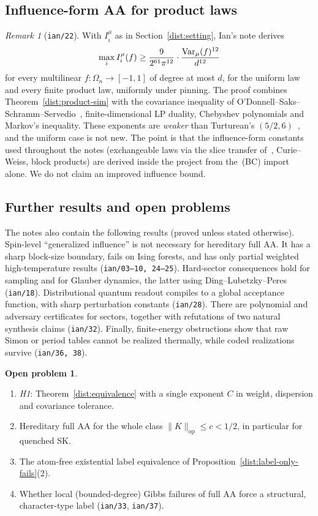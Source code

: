 \documentclass[11pt]{article}
\theoremstyle{definition}\newtheorem{definition}[theorem]{Definition}
\newtheorem{problem}[theorem]{Open problem}
\theoremstyle{remark}\newtheorem{remark}[theorem]{Remark}
\begin{document}
\subsection{Influence-form AA for product laws}\label{dist:influence}
\begin{remark}[\texttt{ian/22}]
With \(I_i^\mu\) as in Section~\ref{dist:setting}, Ian's note derives
\[
 \max_iI_i^{\mu}(f)\ge\frac{9}{2^{61}\pi^{12}}\cdot\frac{\operatorname{Var}_\mu(f)^{12}}{d^{12}}
\]
for every multilinear \(f:\Omega_n\to[-1,1]\) of degree at most \(d\), for the
uniform law and every finite product law, uniformly under pinning. The proof
combines Theorem~\ref{dist:product-sim} with the covariance inequality of
O'Donnell--Saks--Schramm--Servedio~\cite{OSSS05}, finite-dimensional LP duality,
Chebyshev polynomials and Markov's inequality. These exponents are
\emph{weaker} than Turturean's \((5/2,6)\)~\cite{Tur26}, and the uniform case is
not new. The point is that the influence-form constants used throughout the
notes (exchangeable laws via the slice transfer of~\cite{GMNR26}, Curie--Weiss,
block products) are derived inside the project from the~(BC) import alone. We
do not claim an improved influence bound.
\end{remark}

\subsection{Further results and open problems}\label{dist:open}
The notes also contain the following results (proved unless stated otherwise).
Spin-level ``generalized influence'' is not necessary for hereditary full AA.
It has a sharp block-size boundary, fails on Ising forests, and has only
partial weighted high-temperature results (\texttt{ian/03--10, 24--25}).
Hard-sector consequences hold for sampling and for Glauber dynamics, the latter
using Ding--Lubetzky--Peres (\texttt{ian/18}). Distributional quantum readout
compiles to a global acceptance function, with sharp perturbation constants
(\texttt{ian/28}). There are polynomial and adversary certificates for sectors,
together with refutations of two natural synthesis claims (\texttt{ian/32}).
Finally, finite-energy obstructions show that raw Simon or period tables cannot
be realized thermally, while coded realizations survive (\texttt{ian/36, 38}).

\begin{problem}\label{dist:open-list}
\leavevmode
\begin{enumerate}
\item \emph{H1}: Theorem~\ref{dist:equivalence} with a single exponent \(C\) in
weight, dispersion and covariance tolerance.
\item Hereditary full AA for the whole class \(\|K\|_{\mathrm{op}}\le c<1/2\),
in particular for quenched SK.
\item The atom-free existential label equivalence of
Proposition~\ref{dist:label-only-fails}(2).
\item Whether local (bounded-degree) Gibbs failures of full AA force a
structural, character-type label (\texttt{ian/33}, \texttt{ian/37}).
\end{enumerate}
\end{problem}
\end{document}
